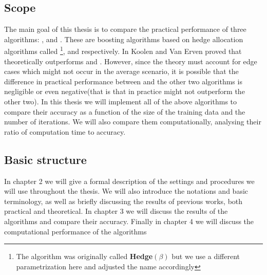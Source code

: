 \subsection{Scope}
The main goal of this thesis is to compare the practical performance of three algorithms: \adaB, \NHB and \squintB. These are boosting algorithms based on hedge allocation algorithms called \hedge\footnote{The algorithm was originally called \textbf{Hedge}$(\beta)$ but we use a different parametrization here and adjusted the name accordingly}, \adaN and \squint respectively. In \cite{Koolen2015} Koolen and Van Erven proved that \squint theoretically outperforms \hedge and \adaN. However, since the theory must account for edge cases which might not occur in the average scenario, it is possible that the difference in practical performance between \squint and the other two algorithms is negligible or even negative(that is that in practice \squintB might not outperform the other two). In this thesis we will implement all of the above algorithms to compare their accuracy as a function of the size of the training data and the number of iterations. We will also compare them computationally, analysing their ratio of computation time to accuracy.  

\subsection{Basic structure}
In chapter 2 we will give a formal description of the settings and procedures we will use throughout the thesis. We will also introduce the notations and basic terminology, as well as briefly discussing the results of previous works, both practical and theoretical. In chapter 3 we will discuss the results of the algorithms and compare their accuracy. Finally in chapter 4 we will discuss the computational performance of the algorithms    

